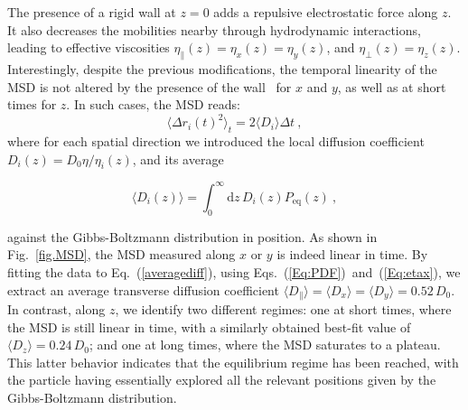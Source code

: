 The presence of a rigid wall at $z=0$ adds a repulsive electrostatic force along $z$. It also decreases the mobilities nearby through hydrodynamic interactions, leading to effective viscosities $\eta_\parallel(z)=\eta_x(z)=\eta_y(z)$, and $\eta_\bot(z) = \eta_z(z)$. Interestingly, despite the previous modifications, the temporal linearity of the MSD is not altered by the presence of the wall~\cite{chubynsky_diffusing_2014,prieve_measurement_1999} for $x$ and $y$, as well as at short times for $z$. In such cases, the MSD reads:
\begin{equation}
	\langle\Delta r_i(t)^2 \rangle_t = 2 \langle D_i \rangle \Delta t\ ,
	\label{averagediff}
\end{equation}
where for each spatial direction we introduced the local diffusion coefficient $D_i(z)=D_0\eta /\eta _i(z)$, and its average 

\begin{equation}
	\langle D_i(z) \rangle = \int_0^{\infty} \textrm{d}z\, D_i(z)P_{\textrm{eq}}(z) ~,
\end{equation}  

against the Gibbs-Boltzmann distribution in position. As shown in Fig.~\ref{fig.MSD}, the MSD measured along $x$ or $y$ is indeed linear in time. By fitting the data to Eq.~(\ref{averagediff}), using Eqs.~(\ref{Eq:PDF})~and~(\ref{Eq:etax}), we extract an average transverse diffusion coefficient $\langle D_\parallel \rangle= \langle D_x\rangle=\langle D_y \rangle= 0.52\, D_0$. In contrast, along $z$, we identify two different regimes: one at short times, where the \gls{MSD} is still linear in time, with a similarly obtained best-fit value of $\langle D_z \rangle= 0.24\, D_0$; and one at long times, where the MSD saturates to a plateau. This latter behavior indicates that the equilibrium regime has been reached, with the particle having essentially explored all the relevant positions given by the Gibbs-Boltzmann distribution.

